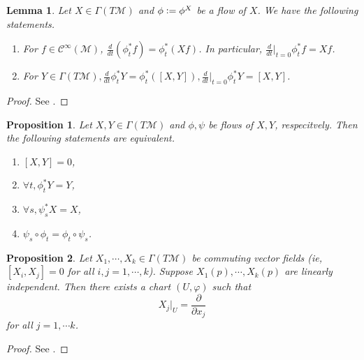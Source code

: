 \documentclass[10pt]{article}
\newtheorem{proposition}{Proposition}[section]
\newtheorem{lemma}{Lemma}[section]
\newcommand{\defeq}{\vcentcolon=}
\newcommand{\R}[0]{\mathbb{R}}
\newcommand{\M}[0]{\mathcal{M}}
\newcommand{\cinf}[0]{\mathcal{C}^\infty}
\newcommand{\pd}[2]{{\frac {\partial #1} {\partial #2}}}
\begin{document}
\begin{lemma}
  Let $X\in\Gamma(T\M)$ and $\phi \defeq \phi^X$ be a flow of $X$. We have the following statements.
  \begin{enumerate}[1).]
    \item For $f\in\cinf(\M)$, ${\frac d {dt}}(\phi_t^*f) = \phi_t^*(Xf)$. In particular, ${\frac d {dt}}|_{t=0}\phi^*_tf = Xf$.
    \item For $Y\in\Gamma(T\M),{\frac d {dt}}\phi_t^*Y=\phi_t^*([X,Y]),{\frac d {dt}}|_{t=0}\phi^*_tY = [X,Y]$.
  \end{enumerate}
\end{lemma}

\begin{proof}
  See \cite{Lee}.
\end{proof}

\begin{proposition}
  Let $X,Y\in\Gamma(T\M)$ and $\phi,\psi$ be flows of $X,Y$, respecitvely. Then the following statements are equivalent.
  \begin{enumerate}[1).]
    \item $[X,Y]=0$, 
    \item $\forall t, \phi^*_tY = Y$,
    \item $\forall s, \psi^*_sX = X$,
    \item $\psi_s\circ\phi_t = \phi_t\circ\psi_s$.
  \end{enumerate}
\end{proposition}

\begin{proposition}
  Let $X_1,\cdots,X_k\in\Gamma(T\M)$ be commuting vector fields (ie, $[X_i,X_j] = 0$ for all $i,j=1,\cdots,k$).
  Suppose $X_1(p),\cdots,X_k(p)$ are linearly independent. Then there exists a chart $(U,\varphi)$ such that 
  \begin{equation*}
    X_j|_U = \pd{}{x_j}
  \end{equation*}
  for all $j=1,\cdots k$.
\end{proposition}

\begin{proof}
See \cite{Lee}.
\end{proof}
\end{document}
